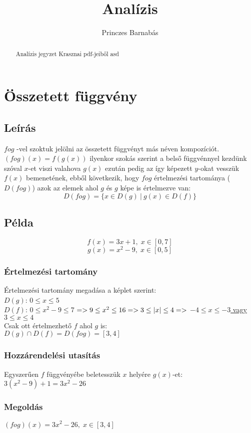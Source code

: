 \documentclass{article}
\title{Analízis}
\author{Princzes
Barnabás}
\theoremstyle{mytheoremstyle}
\theoremstyle{mytheoremstyle}
\theoremstyle{myproblemstyle}
\begin{document}
\maketitle
\begin{abstract}
    Analízis jegyzet Krasznai pdf-jeiből asd
\end{abstract}
\section{Összetett függvény}
\subsection{Leírás}
$fog$ -vel szoktuk jelölni az összetett függvényt más néven kompozíciót.\\
$(fog)(x) = f(g(x))$ ilyenkor szokás szerint a belső függvénnyel
kezdünk szóval $x$-et viszi valahova $g(x)$ ezután pedig az így képezett $y$-okat vesszük
$f(x)$ bemenetének, ebből következik, hogy $fog$ értelmezési tartománya ($D(fog)$)
azok az elemek ahol $g$ és $g$ képe is értelmezve van:
$$D(fog)=\{x\in D(g)\:|\:g(x)\in D(f)\}$$
\subsection{Példa}
$$f(x)=3x+1,\;x\in [0,7]$$
$$g(x)=x^2-9,\;x\in [0,5]$$
\subsubsection{Értelmezési tartomány}
Értelmezési tartomány megadása a képlet szerint:\\
$D(g)$: $0\leq x\leq 5$\\
$D(f)$: \underline{$0\leq x^2-9\leq 7$}
$ => 9\leq x^2\leq 16 => 3\leq \abs{x}\leq 4 => $
\underline{$-4\leq x\leq -3$ vagy $3\leq x\leq 4$}\\
Csak ott értelmezhető $f$ ahol $g$ is:\\
$D(g) \cap D(f) = D(fog) = [3,4]$\\
\subsubsection{Hozzárendelési utasítás}
Egyszerűen $f$ függvényébe beletesszük $x$ helyére $g(x)$-et:\\
$3(x^2-9)+1 = 3x^2-26$
\subsubsection{Megoldás}
$(fog)(x) = 3x^2-26,\;x\in [3,4]$
\end{document}
